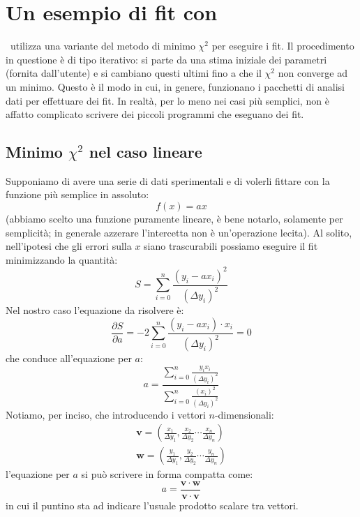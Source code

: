 \chapter{Un esempio di fit con \scilab}

\gnuplot\ utilizza una variante del metodo di minimo $\chi^2$ per eseguire i
fit. Il procedimento in questione \`e di tipo iterativo: si parte da una stima
iniziale dei parametri (fornita dall'utente) e si cambiano questi ultimi
fino a che il $\chi^2$ non converge ad un minimo. Questo \`e il modo in cui,
in genere, funzionano i pacchetti di analisi dati per effettuare dei fit.
In realt\`a, per lo meno nei casi pi\`u semplici, non \`e affatto complicato
scrivere dei piccoli programmi che eseguano dei fit.

\section{Minimo \texorpdfstring{$\chi^2$}{chi2} nel caso lineare}

Supponiamo di avere una serie di dati sperimentali  e di volerli fittare con
la funzione pi\`u semplice in assoluto:
\begin{equation}
f(x) = a x
\end{equation}
(abbiamo scelto una funzione puramente lineare, \`e bene notarlo, solamente
per semplicit\`a; in generale azzerare l'intercetta non \`e un'operazione
lecita).
Al solito, nell'ipotesi che gli errori sulla $x$ siano trascurabili possiamo
eseguire il fit minimizzando la quantit\`a:
\begin{equation}
S = \sum_{i=0}^n\frac{(y_i - a x_i)^2}{(\Delta y_i)^2}
\end{equation}
Nel nostro caso l'equazione da risolvere \`e:
\begin{equation}
\frac{\partial S}{\partial a} =
-2\sum_{i=0}^n\frac{(y_i - a x_i)\cdot x_i}{(\Delta y_i)^2}  = 0
\end{equation}
che conduce all'equazione per $a$:
\begin{equation}
a = \frac{\displaystyle \sum_{i=0}^n\frac{y_ix_i}{(\Delta y_i)^2}}
{\displaystyle \sum_{i=0}^n\frac{(x_i)^2}{(\Delta y_i)^2}}
\end{equation}
Notiamo, per inciso, che introducendo i vettori $n$-dimensionali:
\begin{eqnarray}
\mathbf{v} = \left(\frac{x_1}{\Delta y_1}, \frac{x_2}{\Delta y_2} \cdots 
\frac{x_n}{\Delta y_n}\right)\\\nonumber
\mathbf{w} = \left(\frac{y_1}{\Delta y_1}, \frac{y_2}{\Delta y_2} \cdots
\frac{y_n}{\Delta y_n}\right)
\end{eqnarray}
l'equazione per $a$ si pu\`o scrivere in forma compatta come:
\begin{equation}
a = \frac{\mathbf{v} \cdot \mathbf{w}}{\mathbf{v} \cdot \mathbf{v}}
\end{equation}
in cui il puntino sta ad indicare l'usuale prodotto scalare tra vettori.

